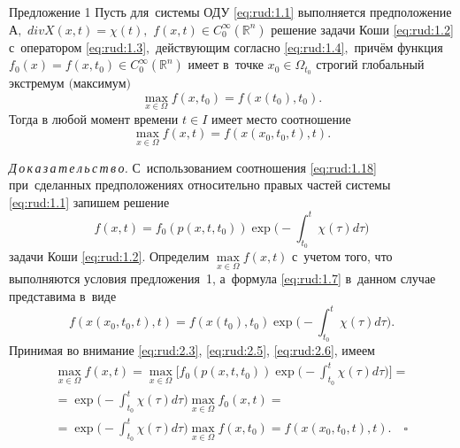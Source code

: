 \smallskip

\begin{newthm}{Предложение 1}
Пусть для~системы ОДУ \eqref{eq:rud:1.1} выполняется предположение
А$,$ $div X(x,t)=\chi(t),$ $f(x,t)\in C_0^{\infty}(\mathbb R^n)$
решение задачи Коши \eqref{eq:rud:1.2} с~оператором
\eqref{eq:rud:1.3}$,$ действующим согласно \eqref{eq:rud:1.4}$,$
причём функция $f_0(x)=f(x,t_0)\in C_0^{\infty}(\mathbb R^n)$
имеет в~точке $x_0\in\Omega_{t_0}$ строгий глобальный экстремум
$($максимум\/$)$
\begin{equation}
\max\limits_{x\in\Omega}f(x,t_0)=f(x(t_0),t_0).\label{eq:rud:2.3}
\end{equation}
Тогда в любой момент времени $t\in I$ имеет место соотношение
\begin{equation}
\max\limits_{x\in\Omega}f(x,t)=f(x(x_0,t_0,t),t).\label{eq:rud:2.4}
\end{equation}
\end{newthm}


\smallskip

\textit{Д\,о\,к\,а\,з\,а\,т\,е\,л\,ь\,с\,т\,в\,о.}
 С~использованием соотношения \eqref{eq:rud:1.18} при~сделанных
предположениях относительно правых частей системы
\eqref{eq:rud:1.1} запишем решение
\begin{equation}
f(x,t)=f_0(p(x,t,t_0)) \exp{\biggl(-\int _{t_0}^{t}\chi(\tau)d\tau\biggr)}\label{eq:rud:2.5}
\end{equation}
задачи Коши \eqref{eq:rud:1.2}. 
Определим $\max\limits_{x\in\Omega}f(x,t)$ с~учетом того, что выполняются
условия предложения~1, а~формула \eqref{eq:rud:1.7} в~данном случае представима в~виде
\begin{equation}
f(x(x_0,t_0,t),t)=f(x(t_0),t_0)\exp{\biggl(-\int _{t_0}^{t}\chi(\tau)d\tau\biggr)}.\label{eq:rud:2.6}
\end{equation}
Принимая во внимание \eqref{eq:rud:2.3}, \eqref{eq:rud:2.5}, \eqref{eq:rud:2.6}, имеем
\begin{multline}
\max\limits_{x\in\Omega}f(x,t)=\max\limits_{x\in\Omega}\biggl[
f_0(p(x,t,t_0))\exp{\biggl(-\int _{t_0}^{t}\chi(\tau)d\tau\biggr)}\biggr]=\\
=\exp{\biggl(-\int _{t_0}^{t}\chi(\tau)d\tau\biggr)} \max\limits_{x\in\Omega}f_0(x,t)=\\
=\exp{\biggl(-\int _{t_0}^{t}\chi(\tau)d\tau\biggr)} \max\limits_{x\in\Omega}f(x,t_0)=f(x(x_0,t_0,t),t).\label{eq:rud:2.7} \quad \square
\end{multline}

\smallskip


